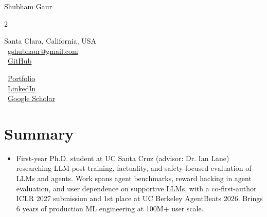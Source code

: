 \documentclass[letterpaper,11pt]{article}
\begin{document}
\begin{center}
    {\LARGE Shubham Gaur} \\ \vspace{0pt}
    \begin{multicols}{2}
    \begin{flushleft}
    \large{Santa Clara, California, USA} \\
    \large{\faEnvelope\ \href{mailto:gshubhaur@gmail.com}{gshubhaur@gmail.com}} \\
    \large{\faGithub\ \href{https://github.com/shubham2345}{GitHub}} \\
    \end{flushleft}

    \begin{flushright}
    \large{\faGlobe\ \href{https://shubham2345.github.io/}{Portfolio}} \\
    \large{\faLinkedin\ \href{https://www.linkedin.com/in/shubhamggaur/}{LinkedIn}} \\
    \large{\faGraduationCap\ \href{https://scholar.google.com/citations?hl=en&user=afguXvoAAAAJ}{Google Scholar}} \\
    \end{flushright}
    \end{multicols}
\end{center}

\section{Summary}
\begin{itemize}[leftmargin=0.15in, label={}]
  \item[] \small First-year Ph.D. student at UC Santa Cruz (advisor: Dr. Ian Lane) researching LLM post-training,
  factuality, and safety-focused evaluation of LLMs and agents. Work spans agent benchmarks, reward hacking in
  agent evaluation, and user dependence on supportive LLMs, with a co-first-author ICLR 2027 submission and
  1st place at UC Berkeley AgentBeats 2026. Brings 6 years of production ML engineering at 100M+ user scale.
\end{itemize}

\end{document}
